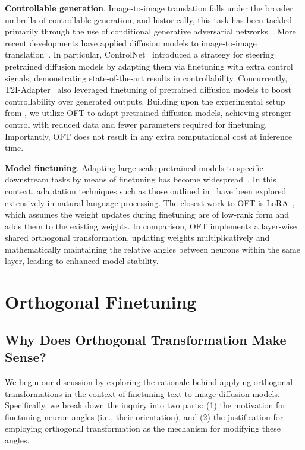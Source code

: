 \textbf{Controllable generation}. Image-to-image translation falls under the broader umbrella of controllable generation, and historically, this task has been tackled primarily through the use of conditional generative adversarial networks~\cite{isola2017image,zhu2017toward,wang2018high,park2019semantic,choi2018stargan}. More recent developments have applied diffusion models to image-to-image translation~\cite{saharia2022palette,voynov2022sketch,wang2022pretraining}. In particular, ControlNet~\cite{zhang2023adding} introduced a strategy for steering pretrained diffusion models by adapting them via finetuning with extra control signals, demonstrating state-of-the-art results in controllability. Concurrently, T2I-Adapter~\cite{mou2023t2i} also leveraged finetuning of pretrained diffusion models to boost controllability over generated outputs. Building upon the experimental setup from \cite{zhang2023adding,mou2023t2i}, we utilize OFT to adapt pretrained diffusion models, achieving stronger control with reduced data and fewer parameters required for finetuning. Importantly, OFT does not result in any extra computational cost at inference time.

\textbf{Model finetuning}. Adapting large-scale pretrained models to specific downstream tasks by means of finetuning has become widespread~\cite{devlin2018bert,brown2020language,he2022masked}. In this context, adaptation techniques such as those outlined in~\cite{hulora2022,houlsby2019parameter,pfeiffer2020adapterfusion} have been explored extensively in natural language processing. The closest work to OFT is LoRA~\cite{hulora2022}, which assumes the weight updates during finetuning are of low-rank form and adds them to the existing weights. In comparison, OFT implements a layer-wise shared orthogonal transformation, updating weights multiplicatively and mathematically maintaining the relative angles between neurons within the same layer, leading to enhanced model stability.

\section{Orthogonal Finetuning}

\subsection{Why Does Orthogonal Transformation Make Sense?}

We begin our discussion by exploring the rationale behind applying orthogonal transformations in the context of finetuning text-to-image diffusion models. Specifically, we break down the inquiry into two parts: (1) the motivation for finetuning neuron angles (i.e., their orientation), and (2) the justification for employing orthogonal transformation as the mechanism for modifying these angles.

